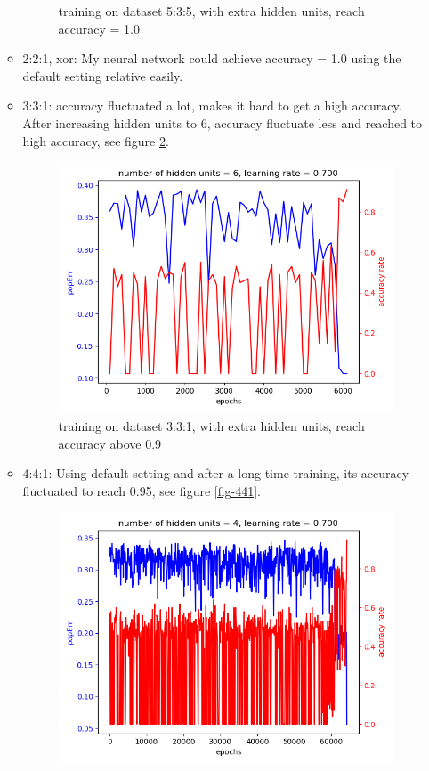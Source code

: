 \documentclass[11pt]{article}
\begin{document}
\begin{enumerate}
\begin{itemize}
\begin{figure}[htb]
\caption{training on dataset 5:3:5, with extra hidden units, reach accuracy = 1.0 \label{fig-535}}
\end{figure}
\item 2:2:1, xor: My neural network could achieve accuracy = 1.0 using the default setting relative easily.
\item 3:3:1: accuracy fluctuated a lot, makes it hard to get a high accuracy. After increasing hidden units to 6, accuracy fluctuate less and reached to high accuracy, see figure \ref{fig-331}.
\begin{figure}[htb]
\centering
\includegraphics[width=.9\linewidth]{./popErr_vs_accuracy_on_331_dataset.png}
\caption{training on dataset 3:3:1, with extra hidden units, reach accuracy above 0.9 \label{fig-331}}
\end{figure}
\item 4:4:1: Using default setting and after a long time training, its accuracy fluctuated to reach 0.95, see figure \ref{fig-441}.
\begin{figure}[htb]
\centering
\includegraphics[width=.9\linewidth]{./popErr_vs_accuracy_on_441.png}

\end{figure}
\end{itemize}
\end{enumerate}
\end{document}
